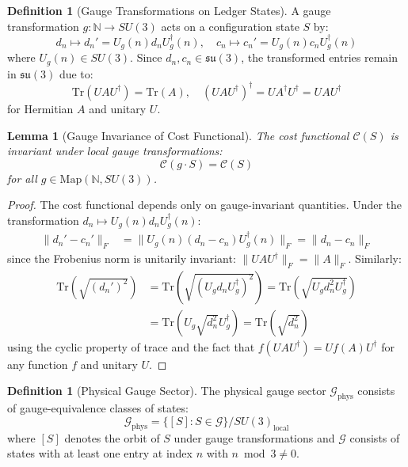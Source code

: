 \documentclass[11pt]{article}
\numberwithin{equation}{section}
\newtheorem{lemma}[theorem]{Lemma}
\theoremstyle{definition}
\newtheorem{definition}[theorem]{Definition}
\theoremstyle{remark}
\begin{document}
\begin{definition}[Gauge Transformations on Ledger States]
A gauge transformation $g: \mathbb{N} \to SU(3)$ acts on a configuration state $S$ by:
\begin{equation}
d_n \mapsto d_n' = U_g(n) d_n U_g^\dagger(n), \quad c_n \mapsto c_n' = U_g(n) c_n U_g^\dagger(n)
\end{equation}
where $U_g(n) \in SU(3)$. Since $d_n, c_n \in \mathfrak{su}(3)$, the transformed entries remain in $\mathfrak{su}(3)$ due to:
\begin{equation}
\text{Tr}(U A U^\dagger) = \text{Tr}(A), \quad (U A U^\dagger)^\dagger = U A^\dagger U^\dagger = U A U^\dagger
\end{equation}
for Hermitian $A$ and unitary $U$.
\end{definition}

\begin{lemma}[Gauge Invariance of Cost Functional]
The cost functional $\mathcal{C}(S)$ is invariant under local gauge transformations:
\begin{equation}
\mathcal{C}(g \cdot S) = \mathcal{C}(S)
\end{equation}
for all $g \in \text{Map}(\mathbb{N}, SU(3))$.
\end{lemma}

\begin{proof}
The cost functional depends only on gauge-invariant quantities. Under the transformation $d_n \mapsto U_g(n) d_n U_g^\dagger(n)$:
\begin{align}
\|d_n' - c_n'\|_F &= \|U_g(n)(d_n - c_n)U_g^\dagger(n)\|_F = \|d_n - c_n\|_F
\end{align}
since the Frobenius norm is unitarily invariant: $\|UAU^\dagger\|_F = \|A\|_F$. Similarly:
\begin{align}
\text{Tr}(\sqrt{(d_n')^2}) &= \text{Tr}(\sqrt{(U_g d_n U_g^\dagger)^2}) = \text{Tr}(\sqrt{U_g d_n^2 U_g^\dagger}) \\
&= \text{Tr}(U_g \sqrt{d_n^2} U_g^\dagger) = \text{Tr}(\sqrt{d_n^2})
\end{align}
using the cyclic property of trace and the fact that $f(UAU^\dagger) = Uf(A)U^\dagger$ for any function $f$ and unitary $U$.
\end{proof}

\begin{definition}[Physical Gauge Sector]
The physical gauge sector $\mathcal{G}_{\text{phys}}$ consists of gauge-equivalence classes of states:
\begin{equation}
\mathcal{G}_{\text{phys}} = \{[S] : S \in \mathcal{G}\} / SU(3)_{\text{local}}
\end{equation}
where $[S]$ denotes the orbit of $S$ under gauge transformations and $\mathcal{G}$ consists of states with at least one entry at index $n$ with $n \bmod 3 \neq 0$.
\end{definition}
\end{document}
